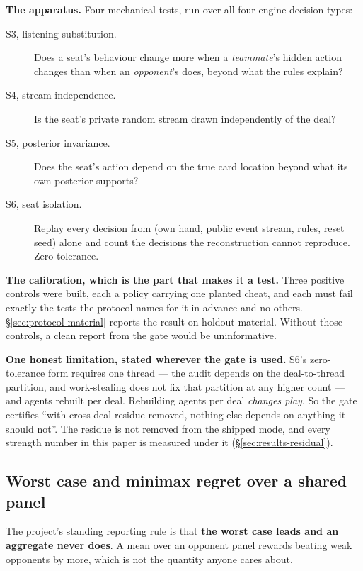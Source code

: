 \textbf{The apparatus.} Four mechanical tests, run over all four engine decision types:

\begin{description}
\item[S3, listening substitution.] Does a seat's behaviour change more when a \emph{teammate}'s
  hidden action changes than when an \emph{opponent}'s does, beyond what the rules explain?
\item[S4, stream independence.] Is the seat's private random stream drawn independently of the deal?
\item[S5, posterior invariance.] Does the seat's action depend on the true card location beyond what
  its own posterior supports?
\item[S6, seat isolation.] Replay every decision from (own hand, public event stream, rules, reset
  seed) alone and count the decisions the reconstruction cannot reproduce. Zero tolerance.
\end{description}

\textbf{The calibration, which is the part that makes it a test.} Three positive controls were
built, each a policy carrying one planted cheat, and each must fail exactly the tests the protocol
names for it in advance and no others. \S\ref{sec:protocol-material} reports the result on holdout
material. Without those controls, a clean report from the gate would be uninformative.

\textbf{One honest limitation, stated wherever the gate is used.} S6's zero-tolerance form requires
one thread --- the audit depends on the deal-to-thread partition, and work-stealing does not fix that
partition at any higher count --- and agents rebuilt per deal. Rebuilding agents per deal
\emph{changes play}. So the gate certifies ``with cross-deal residue removed, nothing else depends on
anything it should not''. The residue is not removed from the shipped mode, and every strength number
in this paper is measured under it (\S\ref{sec:results-residual}).

\subsection{Worst case and minimax regret over a shared panel}
\label{sec:methodology-panel}

The project's standing reporting rule is that \textbf{the worst case leads and an aggregate never
does}. A mean over an opponent panel rewards beating weak opponents by more, which is not the
quantity anyone cares about.

